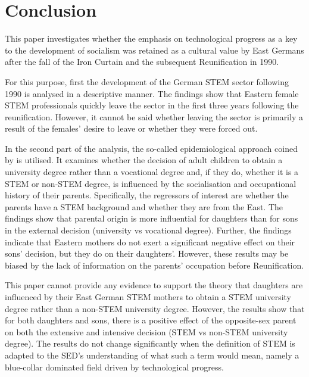 \documentclass[a4paper, oneside, hyperfootnotes = false]{article}
\begin{document}
{\clearpage

\section{Conclusion}
\label{conclusion}

This paper investigates whether the emphasis on technological progress as a key to the development of socialism was retained as a cultural value by East Germans after the fall of the Iron Curtain and the subsequent Reunification in 1990.

For this purpose, first the development of the German STEM sector following 1990 is analysed in a descriptive manner.
The findings show that Eastern female STEM professionals quickly leave the sector in the first three years following the reunification.
However, it cannot be said whether leaving the sector is primarily a result of the females' desire to leave or whether they were forced out.

In the second part of the analysis, the so-called epidemiological approach coined by \cite{Fernandez2011} is utilised.
It examines whether the decision of adult children to obtain a university degree rather than a vocational degree and, if they do, whether it is a STEM or non-STEM degree, is influenced by the socialisation and occupational history of their parents.
Specifically, the regressors of interest are whether the parents have a STEM background and whether they are from the East.
The findings show that parental origin is more influential for daughters than for sons in the external decision (university vs vocational degree).
Further, the findings indicate that Eastern mothers do not exert a significant negative effect on their sons' decision, but they do on their daughters'.
However, these results may be biased by the lack of information on the parents' occupation before Reunification.

This paper cannot provide any evidence to support the theory that daughters are influenced by their East German STEM mothers to obtain a STEM university degree rather than a non-STEM university degree.
However, the results show that for both daughters and sons, there is a positive effect of the opposite-sex parent on both the extensive and intensive decision (STEM vs non-STEM university degree).
The results do not change significantly when the definition of STEM is adapted to the SED's understanding of what such a term would mean, namely a blue-collar dominated field driven by technological progress.

}
\end{document}
